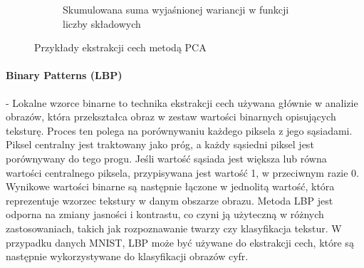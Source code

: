 \documentclass[10pt]{article}
\begin{document}
\begin{figure}[H]
\begin{subfigure}{0.24\textwidth}
        \caption{Skumulowana suma wyjaśnionej wariancji w funkcji liczby składowych}
    \end{subfigure}
    \caption{Przykłady ekstrakcji cech metodą PCA}
\end{figure}



\paragraph*{Binary Patterns (LBP)} - Lokalne wzorce binarne to technika ekstrakcji cech używana głównie w analizie obrazów, która przekształca obraz w zestaw wartości binarnych opisujących teksturę.
Proces ten polega na porównywaniu każdego piksela z jego sąsiadami.
Piksel centralny jest traktowany jako próg, a każdy sąsiedni piksel jest porównywany do tego progu.
Jeśli wartość sąsiada jest większa lub równa wartości centralnego piksela, przypisywana jest wartość 1, w przeciwnym razie 0. Wynikowe wartości binarne są następnie łączone w jednolitą wartość, która reprezentuje wzorzec tekstury w danym obszarze obrazu.
Metoda LBP jest odporna na zmiany jasności i kontrastu, co czyni ją użyteczną w różnych zastosowaniach, takich jak rozpoznawanie twarzy czy klasyfikacja tekstur. W przypadku danych MNIST, LBP może być używane do ekstrakcji cech, które są następnie wykorzystywane do klasyfikacji obrazów cyfr.
\end{document}
